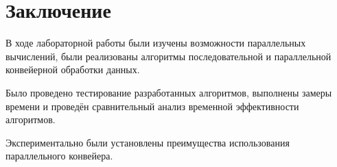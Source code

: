\chapter*{Заключение}

В ходе лабораторной работы были изучены возможности параллельных вычислений, были реализованы алгоритмы последовательной и параллельной конвейерной обработки данных.

Было проведено тестирование разработанных алгоритмов, выполнены замеры времени и проведён сравнительный анализ временной эффективности алгоритмов.

Экспериментально были установлены преимущества использования параллельного конвейера.